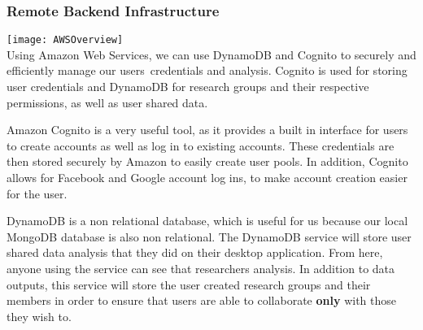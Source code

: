 \subsubsection{Remote Backend Infrastructure}
\texttt{[image: AWSOverview]} \\
Using Amazon Web Services, we can use DynamoDB and Cognito to securely and efficiently manage our users\textquotesingle\ credentials and analysis. Cognito is used for storing user credentials and DynamoDB for research groups and their respective permissions, as well as user shared data.\par
Amazon Cognito is a very useful tool, as it provides a built in interface for users to create accounts as well as log in to existing accounts. These credentials are then stored securely by Amazon to easily create user pools. In addition, Cognito allows for Facebook and Google account log ins, to make account creation easier for the user.\par
DynamoDB is a non relational database, which is useful for us because our local MongoDB database is also non relational. The DynamoDB service will store user shared data analysis that they did on their desktop application. From here, anyone using the service can see that researcher\textquotesingle s analysis. In addition to data outputs, this service will store the user created research groups and their members in order to ensure that users are able to collaborate \textbf{only} with those they wish to.
